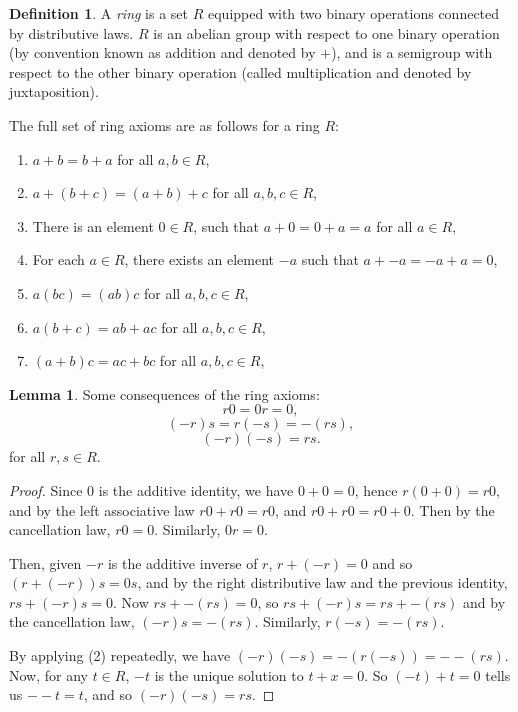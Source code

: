 \documentclass{article}
\theoremstyle{definition}
\newtheorem{definition}{Definition}[section]
\newtheorem{lemma}[theorem]{Lemma}
\begin{document}
  \begin{definition}
    A \emph{ring} is a set $R$ equipped with two binary operations connected by
    distributive laws. $R$ is an abelian group with respect to one binary
    operation (by convention known as addition and denoted by $+$), and is a
    semigroup with respect to the other binary operation (called multiplication
    and denoted by juxtaposition).

    The full set of ring axioms are as follows for a ring $R$:
    \begin{enumerate}
        \item
          $ a + b = b + a $ for all $ a, b \in R$,
        \item
          $ a + (b + c) = (a + b) + c $ for all $ a, b, c \in R$,
        \item
          There is an element $0 \in R$, such that
          $a + 0 = 0 + a = a$ for all $a \in R$,
        \item
          For each $a \in R$, there exists an element $-a$ such that
          $a + -a = -a + a = 0$,

        \item
          $ a(bc) = (ab)c $ for all $ a, b, c \in R$,

        \item
          $ a(b+c) = ab + ac $ for all $ a, b, c \in R$,
        \item
          $ (a+b)c = ac + bc $ for all $ a, b, c \in R$,

    \end{enumerate}
  \end{definition}

  \begin{lemma}
    Some consequences of the ring axioms:
    \begin{equation}
      r0 = 0r = 0,
    \end{equation}
    \begin{equation}
      (-r)s = r(-s) = -(rs),
    \end{equation}
    \begin{equation}
      (-r)(-s) = rs.
    \end{equation}
    for all $r, s \in R$.
  \end{lemma}

  \begin{proof}
    Since $0$ is the additive identity, we have $0 + 0 = 0$,
    hence $r(0+0) = r0$, and by the left associative law
    $ r0 + r0 = r0 $, and $r0 + r0 = r0 + 0$. Then by the
    cancellation law, $r0 = 0$. Similarly, $0r = 0$.

    Then, given $-r$ is the additive inverse of $r$, $r + (-r) = 0$ and so
    $(r + (-r))s = 0s$, and by the right distributive law and the previous
    identity, $rs + (-r)s = 0$. Now $rs + -(rs) = 0$, so
    $rs + (-r)s = rs + -(rs)$ and by the cancellation law, $(-r)s = -(rs)$.
    Similarly, $r(-s) = -(rs)$.

    By applying (2) repeatedly, we have $(-r)(-s) = -(r(-s)) = --(rs)$.
    Now, for any $t \in R$, $-t$ is the unique solution to $t + x = 0$.
    So $(-t) + t = 0$ tells us $--t = t$, and so $(-r)(-s) = rs$.
  \end{proof}
\end{document}
